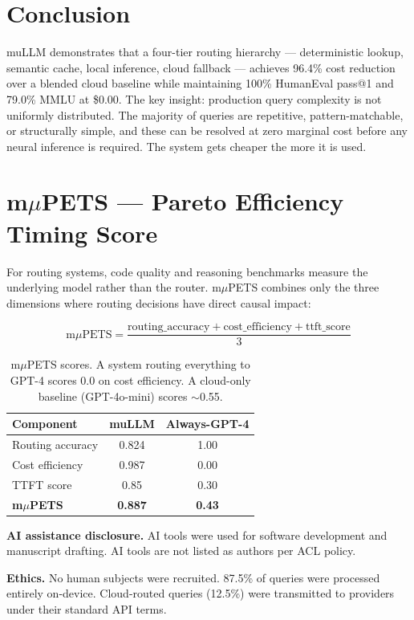 \documentclass[11pt]{article}
\begin{document}
\section{Conclusion}

muLLM demonstrates that a four-tier routing hierarchy --- deterministic
lookup, semantic cache, local inference, cloud fallback --- achieves
96.4\% cost reduction over a blended cloud baseline while maintaining
100\% HumanEval pass@1 and 79.0\% MMLU at \$0.00. The key insight:
production query complexity is not uniformly distributed. The majority
of queries are repetitive, pattern-matchable, or structurally simple,
and these can be resolved at zero marginal cost before any neural
inference is required. The system gets cheaper the more it is used.




\appendix

\section{m$\mu$PETS --- Pareto Efficiency Timing Score}

For routing systems, code quality and reasoning benchmarks measure the
underlying model rather than the router. m$\mu$PETS combines only the
three dimensions where routing decisions have direct causal impact:

\[
\text{m}\mu\text{PETS} = \frac{\text{routing\_accuracy} + \text{cost\_efficiency} + \text{ttft\_score}}{3}
\]

\begin{table}[h]
\centering
\small
\begin{tabular}{lcc}
\toprule
\textbf{Component} & \textbf{muLLM} & \textbf{Always-GPT-4} \\
\midrule
Routing accuracy & 0.824 & 1.00 \\
Cost efficiency & 0.987 & 0.00 \\
TTFT score & 0.85 & 0.30 \\
\midrule
\textbf{m$\mu$PETS} & \textbf{0.887} & \textbf{0.43} \\
\bottomrule
\end{tabular}
\caption{m$\mu$PETS scores. A system routing everything to GPT-4 scores 0.0 on cost efficiency. A cloud-only baseline (GPT-4o-mini) scores $\sim$0.55.}
\label{tab:mpets}
\end{table}

\textbf{AI assistance disclosure.} AI tools were used for software
development and manuscript drafting. AI tools are not listed as authors
per ACL policy.

\textbf{Ethics.} No human subjects were recruited. 87.5\% of queries
were processed entirely on-device. Cloud-routed queries (12.5\%) were
transmitted to providers under their standard API terms.
\end{document}
